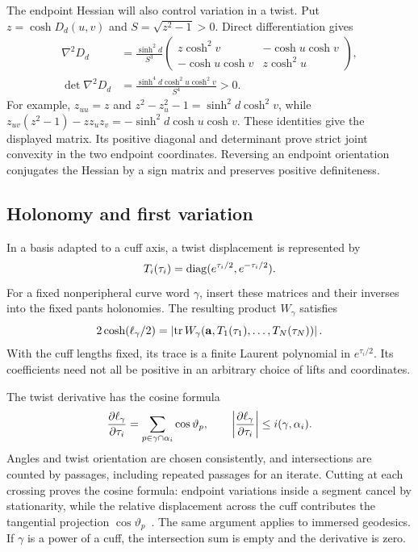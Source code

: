 The endpoint Hessian will also control variation in a twist. Put
$z=\cosh D_d(u,v)$ and $S=\sqrt{z^2-1}>0$. Direct differentiation gives
\begin{equation}
 \begin{aligned}
 \nabla^2D_d&=\frac{\sinh^2d}{S^3}
 \begin{pmatrix}
 z\cosh^2v&-\cosh u\cosh v\\
 -\cosh u\cosh v&z\cosh^2u
 \end{pmatrix},\\
 \det\nabla^2D_d&=
 \frac{\sinh^4d\cosh^2u\cosh^2v}{S^4}>0.
 \end{aligned}
 \label{eq:localdistancehessian}
\end{equation}
For example, $z_{uu}=z$ and
$z^2-z_u^2-1=\sinh^2d\cosh^2v$, while
$z_{uv}(z^2-1)-zz_uz_v=-\sinh^2d\cosh u\cosh v$.
These identities give the displayed matrix. Its positive diagonal and
determinant prove strict joint convexity in the two endpoint coordinates.
Reversing an endpoint orientation conjugates the Hessian by a sign matrix
and preserves positive definiteness.

\subsection{Holonomy and first variation}

In a basis adapted to a cuff axis, a twist displacement is represented by
\[
 T_i(\tau_i)=\operatorname{diag}(e^{\tau_i/2},e^{-\tau_i/2}).
\]
For a fixed nonperipheral curve word $\gamma$, insert these matrices and
their inverses into the fixed pants
holonomies. The resulting product $W_\gamma$ satisfies
\begin{equation}
 2\cosh(\ell_\gamma/2)
  =\left|\operatorname{tr} W_\gamma(\mathbf a,T_1(\tau_1),\ldots,T_N(\tau_N))\right|.
 \label{eq:traceword}
\end{equation}
With the cuff lengths fixed, its trace is a finite Laurent polynomial in
$e^{\tau_i/2}$. Its coefficients need not all be positive in an arbitrary
choice of lifts and coordinates.

The twist derivative has the cosine formula
\begin{equation}
 \frac{\partial\ell_\gamma}{\partial\tau_i}
   =\sum_{p\in\gamma\cap\alpha_i}\cos\vartheta_p,
 \qquad
 \left|\frac{\partial\ell_\gamma}{\partial\tau_i}\right|
      \le i(\gamma,\alpha_i).
 \label{eq:cosine}
\end{equation}
Angles and twist orientation are chosen consistently, and intersections
are counted by passages, including repeated passages for an iterate.
Cutting at each crossing proves the cosine formula: endpoint variations
inside a segment cancel by stationarity, while the relative displacement
across the cuff contributes the tangential projection
$\cos\vartheta_p$~\cite{WolpertTwist}. The same argument applies to
immersed geodesics. If $\gamma$ is a power of a cuff, the intersection
sum is empty and the derivative is zero.

